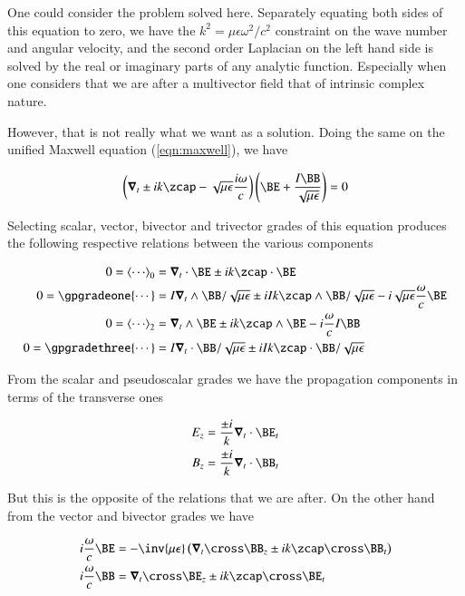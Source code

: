 One could consider the problem solved here.  Separately equating both sides of this equation to zero, we have the $k^2 = \mu\epsilon \omega^2/c^2$ constraint on the wave number and angular velocity, and the second order Laplacian on the left hand side is solved by the real or imaginary parts of any analytic function.  Especially when one considers that we are after a multivector field that of intrinsic complex nature.

However, that is not really what we want as a solution.  Doing the same on the unified Maxwell equation (\ref{eqn:maxwell}), we have

\begin{align}\label{eqn:max2}
\left(\spacegrad_t \pm i k \zcap - \sqrt{\mu\epsilon}\frac{i\omega}{c}\right) \left(\BE + \frac{I\BB}{\sqrt{\mu\epsilon}} \right) = 0
\end{align}

Selecting scalar, vector, bivector and trivector grades of this equation produces the following respective relations between the various components

\begin{align}
0 = \gpgradezero{\cdots} &= \spacegrad_t \cdot \BE \pm i k \zcap \cdot \BE \\
0 = \gpgradeone{\cdots} &= I \spacegrad_t \wedge \BB/\sqrt{\mu\epsilon} \pm i I k \zcap \wedge \BB/\sqrt{\mu\epsilon} - i \sqrt{\mu\epsilon}\frac{\omega}{c} \BE \\
0 = \gpgradetwo{\cdots} &= \spacegrad_t \wedge \BE \pm i k \zcap \wedge \BE - i \frac{\omega}{c} I \BB \\
0 = \gpgradethree{\cdots} &= I \spacegrad_t \cdot \BB/\sqrt{\mu\epsilon} \pm i I k \zcap \cdot \BB/\sqrt{\mu\epsilon}
\end{align}

From the scalar and pseudoscalar grades we have the propagation components in terms of the transverse ones

\begin{align}
E_z &= \frac{\pm i}{k} \spacegrad_t \cdot \BE_t \\
B_z &= \frac{\pm i}{k} \spacegrad_t \cdot \BB_t 
\end{align}

But this is the opposite of the relations that we are after.  On the other hand from the vector and bivector grades we have

\begin{align}\label{eqn:messy}
i \frac{\omega}{c} \BE &= -\inv{\mu\epsilon}\left(\spacegrad_t \cross \BB_z \pm i k \zcap \cross \BB_t\right) \\
i \frac{\omega}{c} \BB &= \spacegrad_t \cross \BE_z \pm i k \zcap \cross \BE_t
\end{align}

